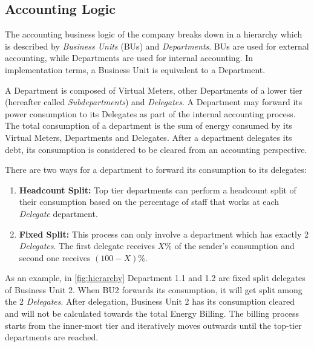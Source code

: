 
\subsection{Accounting Logic} \label{billing}

The accounting business logic of the company breaks down in a hierarchy which is described by \textit{Business Units} (BUs) and \textit{Departments}. BUs are used for external accounting, while Departments are used for internal accounting. In implementation terms, a Business Unit is equivalent to a Department.

A Department is composed of Virtual Meters, other Departments of a lower tier %
 (hereafter called \textit{Subdepartments}) and \textit{Delegates}. A Department may forward its power consumption to its Delegates as part of the internal accounting process. The total consumption of a department is the sum of energy consumed by its Virtual Meters, Departments and Delegates. After a department delegates its debt, its consumption is considered to be cleared from an accounting perspective.


There are two ways for a department to forward its consumption to its delegates:

\begin{enumerate}
    \item \textbf{Headcount Split:} Top tier departments can perform a headcount split of their consumption based on the percentage of staff that works at each \textit{Delegate} department.
    \item \textbf{Fixed Split:} This process can only involve a department which has exactly 2 \textit{Delegates}. The first delegate receives $X\%$ of the sender's consumption and second one receives $(100-X)\%$.
\end{enumerate}

As an example, in \ref{fig:hierarchy} Department 1.1 and 1.2 are fixed split delegates of Business Unit 2. When BU2 forwards its consumption, it will get split among the 2 \textit{Delegates}. After delegation, Business Unit 2 has its consumption cleared and will not be calculated towards the total Energy Billing. The billing process starts from the inner-most tier and iteratively moves outwards until the top-tier departments are reached.


